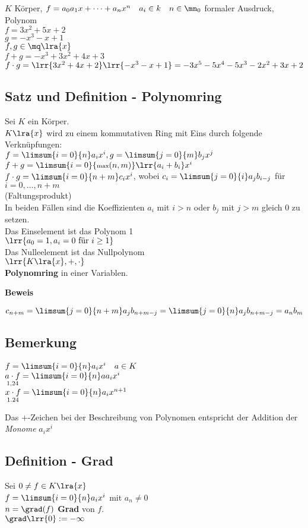 	$K$ Körper, $f=a_0a_1x+\dots+a_nx^n\quad a_i\in k\quad n\in\mn_0$ formaler Ausdruck, Polynom\\
	$f=3x^2+5x+2$\\
	$g=-x^3-x+1$\\
	$f,g\in\mq\lra{x}$\\
	$f+g=-x^3+3x^2+4x+3$\\
	$f\cdot g=\lrr{3x^2+4x+2}\lrr{-x^3-x+1}=-3x^5-5x^4-5x^3-2x^2+3x+2$
\subsection{Satz und Definition - Polynomring}
	Sei $K$ ein Körper.\\
	$K\lra{x}$ wird zu einem kommutativen Ring mit Eins durch folgende Verknüpfungen:\\
	$f=\limsum{i=0}{n}a_ix^i, g=\limsum{j=0}{m}b_jx^j$\\
	$f+g = \limsum{i=0}{\mbox{\scriptsize max}(n,m)}\lrr{a_i+b_i}x^i$\\
	$f\cdot g= \limsum{i=0}{n+m} c_ix^i$, wobei $c_i=\limsum{j=0}{i}a_jb_{i-j}$ für $i=0,\dots,n+m$\\
	(Faltungsprodukt)\\
	In beiden Fällen sind die Koeffizienten $a_i$ mit $i>n$ oder $b_j$ mit $j>m$ gleich $0$ zu setzen.\\
	Das Einselement ist das Polynom 1\\
	$\lrr{a_0=1,a_i=0\mbox{ für }i\geq 1}$\\
	Das Nulleelement ist das Nullpolynom\\
	$\lrr{K\lra{x},+,\cdot}$\\
	\textbf{Polynomring} in einer Variablen.

	\textbf{Beweis}

	$c_{n+m}=\limsum{j=0}{n+m}a_jb_{n+m-j}=\limsum{j=0}{n}a_jb_{n+m-j}=a_nb_m$
\subsection{Bemerkung}
		\item $f=\limsum{i=0}{n}a_ix^i\quad a\in K$\\
			$\underset{1,24}{a\cdot f} =\limsum{i=0}{n}aa_ix^i$\\
			$\underset{1.24}{x\cdot f} =\limsum{i=0}{n}a_ix^{n+1}$
		\item Das $+$-Zeichen bei der Beschreibung von Polynomen entspricht der Addition der \textit{Monome} $a_ix^i$
	\subExEnd
\subsection{Definition - Grad}
	Sei $0\neq f\in K\lra{x}$\\
	$f=\limsum{i=0}{n}a_ix^i$ mit $a_n\neq 0$\\
	$n=\grad(f)$ \textbf{Grad} von $f$.\\
	$\grad\lrr{0}:=-\infty$
